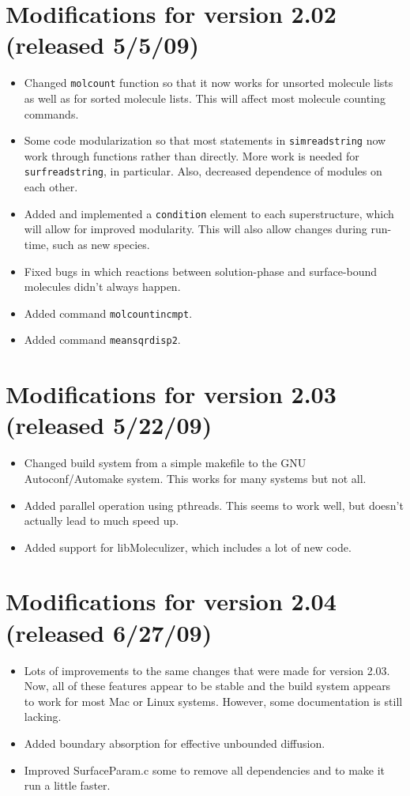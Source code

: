 \documentclass {scrbook}
\newcommand {\ttt} {\texttt}
\begin{document}
\section{Modifications for version 2.02 (released 5/5/09)}
\begin{itemize}
\item Changed \ttt{molcount} function so that it now works for unsorted molecule lists as well as for sorted molecule lists. This will affect most molecule counting commands.
\item Some code modularization so that most statements in \ttt{simreadstring} now work through functions rather than directly. More work is needed for \ttt{surfreadstring}, in particular. Also, decreased dependence of modules on each other.
\item Added and implemented a \ttt{condition} element to each superstructure, which will allow for improved modularity. This will also allow changes during run-time, such as new species.
\item Fixed bugs in which reactions between solution-phase and surface-bound molecules didn't always happen.
\item Added command \ttt{molcountincmpt}.
\item Added command \ttt{meansqrdisp2}.
\end{itemize}

\section{Modifications for version 2.03 (released 5/22/09)}
\begin{itemize}
\item Changed build system from a simple makefile to the GNU Autoconf/Automake system. This works for many systems but not all.
\item Added parallel operation using pthreads. This seems to work well, but doesn't actually lead to much speed up.
\item Added support for libMoleculizer, which includes a lot of new code.
\end{itemize}

\section{Modifications for version 2.04 (released 6/27/09)}
\begin{itemize}
\item Lots of improvements to the same changes that were made for version 2.03. Now, all of these features appear to be stable and the build system appears to work for most Mac or Linux systems. However, some documentation is still lacking.
\item Added boundary absorption for effective unbounded diffusion.
\item Improved SurfaceParam.c some to remove all dependencies and to make it run a little faster.
\end{itemize}
\end{document}
